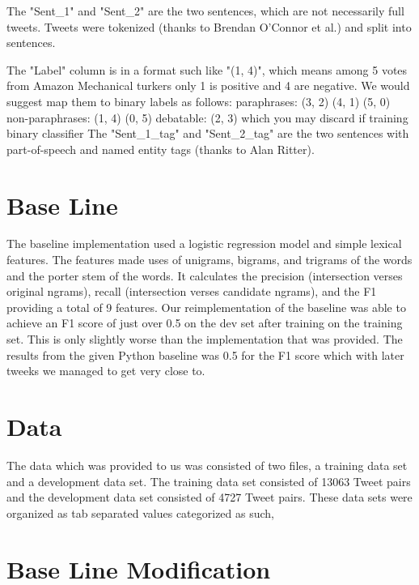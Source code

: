 \documentclass[11pt,letterpaper]{article}
\begin{document}
The "Sent\_1" and "Sent\_2" are the two sentences, which are not necessarily full 
tweets. Tweets were tokenized (thanks to Brendan O'Connor et al.) and 
split into sentences. 
 
The "Label" column is in a format such like "(1, 4)", which means among 5 votes 
from Amazon Mechanical turkers only 1 is positive and 4 are negative. We would 
suggest map them to binary labels as follows:
paraphrases: (3, 2) (4, 1) (5, 0)
non-paraphrases: (1, 4) (0, 5)
debatable: (2, 3)  which you may discard if training binary classifier
The "Sent\_1\_tag" and "Sent\_2\_tag" are the two sentences with part-of-speech 
and named entity tags (thanks to Alan Ritter). 

\section{Base Line}
The baseline implementation used a logistic regression model and simple lexical features. The features made uses of unigrams, bigrams, and trigrams of the words and the porter stem of the words. It calculates the precision (intersection verses original ngrams), recall (intersection verses candidate ngrams), and the F1 providing a total of 9 features. Our reimplementation of the baseline was able to achieve an F1 score of just over 0.5 on the dev set after training on the training set. This is only slightly worse than the implementation that was provided. The results from the given Python baseline was 0.5 for the F1 score which with later tweeks we managed to get very close to.


\section{Data}
The data which was provided to us was consisted of two files, a training data set and a development data set. The training data set consisted of 13063 Tweet pairs and the development data set consisted of 4727 Tweet pairs. These data sets were organized as tab separated values categorized as such,

 

\section{Base Line Modification}
\end{document}
